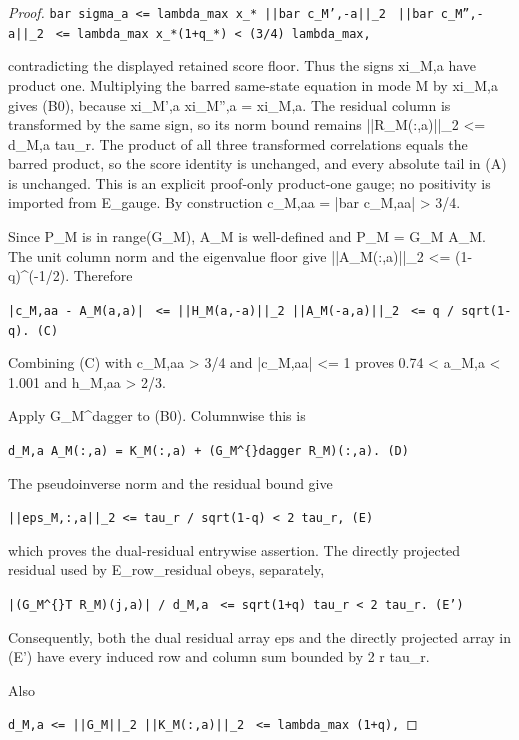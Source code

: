 \begin{lemma}
\begin{proof}
\texttt{bar sigma\_a <= lambda\_max x\_* ||bar c\_M',-a||\_2}
\texttt{                        ||bar c\_M'',-a||\_2}
\texttt{             <= lambda\_max x\_*(1+q\_*) < (3/4) lambda\_max,}

contradicting the displayed retained score floor.  Thus the signs xi\_M,a
have product one.  Multiplying the barred same-state equation in mode M by
xi\_M,a gives (B0), because
xi\_M',a xi\_M'',a = xi\_M,a.  The residual column is transformed by the same
sign, so its norm bound remains ||R\_M(:,a)||\_2 <= d\_M,a tau\_r.  The product
of all three transformed correlations equals the barred product, so the
score identity is unchanged, and every absolute tail in (A) is unchanged.
This is an explicit proof-only
product-one gauge; no positivity is imported from E\_gauge.  By construction
c\_M,aa = |bar c\_M,aa| > 3/4.

Since P\_M is in range(G\_M), A\_M is well-defined and P\_M = G\_M A\_M.
The unit column norm and the eigenvalue floor give
||A\_M(:,a)||\_2 <= (1-q)\textasciicircum{}(-1/2).  Therefore

\texttt{|c\_M,aa - A\_M(a,a)|}
\texttt{  <= ||H\_M(a,-a)||\_2 ||A\_M(-a,a)||\_2}
\texttt{  <= q / sqrt(1-q).                                         (C)}

Combining (C) with c\_M,aa > 3/4 and |c\_M,aa| <= 1 proves
0.74 < a\_M,a < 1.001 and h\_M,aa > 2/3.

Apply G\_M\textasciicircum{}dagger to (B0).  Columnwise this is

\texttt{d\_M,a A\_M(:,a) = K\_M(:,a) + (G\_M\textasciicircum\{\}dagger R\_M)(:,a).             (D)}

The pseudoinverse norm and the residual bound give

\texttt{||eps\_M,:,a||\_2 <= tau\_r / sqrt(1-q) < 2 tau\_r,              (E)}

which proves the dual-residual entrywise assertion.  The directly projected
residual used by E\_row\_residual obeys, separately,

\texttt{|(G\_M\textasciicircum\{\}T R\_M)(j,a)| / d\_M,a}
\texttt{   <= sqrt(1+q) tau\_r < 2 tau\_r.                             (E')}

Consequently, both the dual residual array eps and the directly projected
array in (E') have every induced row and column sum bounded by 2 r tau\_r.

Also

\texttt{d\_M,a <= ||G\_M||\_2 ||K\_M(:,a)||\_2}
\texttt{       <= lambda\_max (1+q),}


\end{proof}
\end{lemma}

